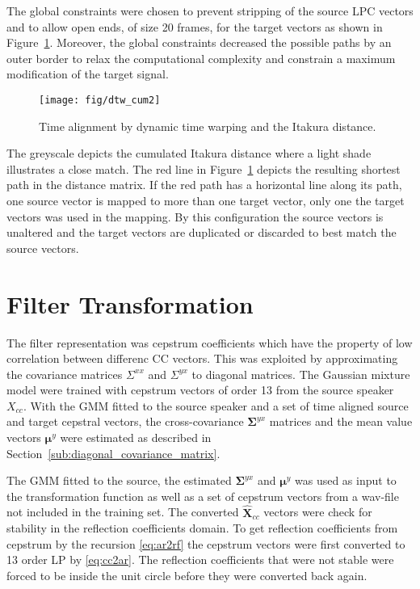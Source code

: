 The global constraints were chosen to prevent stripping of the source LPC vectors and to allow open ends, of size 20 frames, for the target vectors as shown in Figure~\ref{fig:dtw}. Moreover, the global constraints decreased the possible paths by an outer border to relax the computational complexity and constrain a maximum modification of the target signal.
\begin{figure}[htbp]
	\begin{center}
		\texttt{[image: fig/dtw\_cum2]}
		\caption{Time alignment by dynamic time warping and the Itakura distance.}
		\label{fig:dtw}
	\end{center}
\end{figure}
The greyscale depicts the cumulated Itakura distance where a light shade illustrates a close match. The red line in Figure~\ref{fig:dtw} depicts the resulting shortest path in the distance matrix. If the red path has a horizontal line along its path, \ie one source vector is mapped to more than one target vector, only one the target vectors was used in the mapping. By this configuration the source vectors is unaltered and the target vectors are duplicated or discarded to best match the source vectors.



\section{Filter Transformation} %
\label{sec:filter_transformation}
The filter representation was cepstrum coefficients which have the property of low correlation between differenc CC vectors. This was exploited by approximating the covariance matrices $\Sigma^{xx}$ and $\Sigma^{yx}$ to diagonal matrices. The Gaussian mixture model were trained with cepstrum vectors of order 13 from the source speaker $X_{cc}$. With the GMM fitted to the source speaker and a set of time aligned source and target cepstral vectors, the cross-covariance $\mathbf{\Sigma}^{yx}$ matrices and the mean value vectors $\boldsymbol{\mu}^y$ were estimated as described in Section~\ref{sub:diagonal_covariance_matrix}.

The GMM fitted to the source, the estimated $\mathbf{\Sigma}^{yx}$ and $\boldsymbol{\mu}^y$ was used as input to the transformation function as well as a set of cepstrum vectors from a wav-file not included in the training set. The converted $\mathbf{\hat{X}}_{cc}$ vectors were check for stability in the reflection coefficients domain. To get reflection coefficients from cepstrum by the recursion \eqref{eq:ar2rf} the cepstrum vectors were first converted to 13 order LP by \eqref{eq:cc2ar}. The reflection coefficients that were not stable were forced to be inside the unit circle before they were converted back again. 

